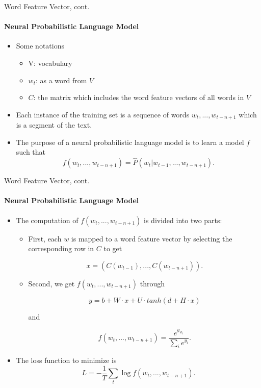 \documentclass{beamer}
\begin{document}
\begin{frame}{Word Feature Vector, cont.}\framesubtitle{Neural Probabilistic Language Model}

    \begin{itemize}
        \item Some notations
            \begin{itemize}
                \item V: vocabulary
                \item $w_t$: as a word from $V$
                \item $C$: the matrix which includes the word feature vectors of all words in $V$
            \end{itemize}
        \item Each instance of the training set is a sequence of words $w_t, ..., w_{t-n+1}$ which is a segment of the text.
        \item The purpose of a neural probabilistic language model is to learn a model $f$ such that
        $$ f(w_t, ..., w_{t-n+1}) = \hat{P}(w_t | w_{t-1},...,w_{t-n+1}).$$
    \end{itemize}
\end{frame}

\begin{frame}{Word Feature Vector, cont.}\framesubtitle{Neural Probabilistic Language Model}
    \begin{itemize}
        \item The computation of $f(w_t, ..., w_{t-n+1})$ is divided into two parts:
            \begin{itemize}
                \item First, each $w$ is mapped to a word feature vector by selecting the corresponding row in $C$ to get

                $$x=(C(w_{t-1}),... ,C(w_{t-n+1})).$$

                \item Second, we get $f(w_t, ..., w_{t-n+1})$ through

                $$y=b+W\cdot x + U\cdot tanh(d + H\cdot x)$$

                and

                $$ f(w_t, ..., w_{t-n+1}) = \frac{e^{y_{w_t}}}{\sum_{i}^{}e^{y_i}}.$$
            \end{itemize}
        \item The loss function to minimize is $$L = -\frac{1}{T}\sum _{t}^{} \log{f(w_t, ..., w_{t-n+1})}.$$
    \end{itemize}
\end{frame}
\end{document}
